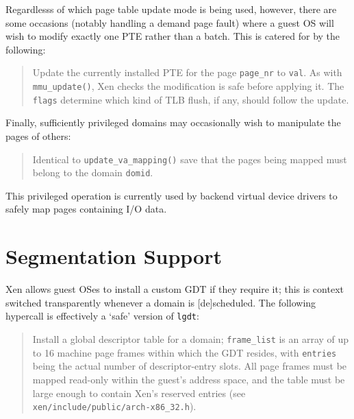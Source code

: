 \documentclass[11pt,twoside,final,openright]{xenstyle}
\begin{document}
Regardlesss of which page table update mode is being used, however,
there are some occasions (notably handling a demand page fault) where
a guest OS will wish to modify exactly one PTE rather than a
batch. This is catered for by the following:

\begin{quote} 

Update the currently installed PTE for the page {\tt page\_nr} to 
{\tt val}. As with {\tt mmu\_update()}, Xen checks the modification 
is safe before applying it. The {\tt flags} determine which kind
of TLB flush, if any, should follow the update. 

\end{quote} 

Finally, sufficiently privileged domains may occasionally wish to manipulate 
the pages of others: 
\begin{quote}


Identical to {\tt update\_va\_mapping()} save that the pages being
mapped must belong to the domain {\tt domid}. 

\end{quote}

This privileged operation is currently used by backend virtual device
drivers to safely map pages containing I/O data. 



\section{Segmentation Support}

Xen allows guest OSes to install a custom GDT if they require it; 
this is context switched transparently whenever a domain is 
[de]scheduled.  The following hypercall is effectively a 
`safe' version of {\tt lgdt}: 

\begin{quote}

Install a global descriptor table for a domain; {\tt frame\_list} is
an array of up to 16 machine page frames within which the GDT resides,
with {\tt entries} being the actual number of descriptor-entry
slots. All page frames must be mapped read-only within the guest's
address space, and the table must be large enough to contain Xen's
reserved entries (see {\tt xen/include/public/arch-x86\_32.h}).

\end{quote}
\end{document}

